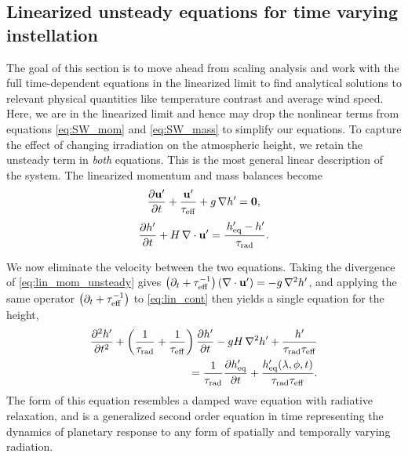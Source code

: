 \documentclass[trackchanges,twocolumn]{aastex7}
\begin{document}
\subsection{Linearized unsteady equations for time varying instellation} \label{sec:second_order}

The goal of this section is to move ahead from scaling analysis and work with the full time-dependent equations in the linearized limit to find analytical solutions to relevant physical quantities like temperature contrast and average wind speed. Here, we are in the linearized limit and hence may drop the nonlinear terms from equations \eqref{eq:SW_mom} and \eqref{eq:SW_mass} to simplify our equations. To capture the effect of changing irradiation on the atmospheric height, we retain the unsteady term in \emph{both} equations. This is the most general linear description of the system. The linearized momentum and mass balances become
\begin{equation}
  \frac{\partial \mathbf{u}'}{\partial t} + \frac{\mathbf{u}'}{\tau_{\rm eff}} + g\,\nabla h' = \mathbf{0},
\label{eq:lin_mom_unsteady}
\end{equation}
\begin{equation}
  \frac{\partial h'}{\partial t} + H\,\nabla\cdot\mathbf{u}'
  = \frac{\,h_{\rm eq}' - h'}{\tau_{\rm rad}}.
\label{eq:lin_cont}
\end{equation}

We now eliminate the velocity between the two equations. Taking the divergence of \eqref{eq:lin_mom_unsteady} gives $\left(\partial_t + \tau_{\rm eff}^{-1}\right)\left(\nabla\cdot\mathbf{u}'\right) = -g\,\nabla^2 h'$, and applying the same operator $\left(\partial_t + \tau_{\rm eff}^{-1}\right)$ to \eqref{eq:lin_cont} then yields a single equation for the height,
\begin{align}
   \frac{\partial^2 h'}{\partial t^2}
   + \left(\frac{1}{\tau_{\rm rad}} + \frac{1}{\tau_{\rm eff}}\right)\frac{\partial h'}{\partial t}
   - gH\,\nabla^2 h'
   + \frac{h'}{\tau_{\rm rad}\tau_{\rm eff}} \nonumber \\
   = \frac{1}{\tau_{\rm rad}}\frac{\partial h'_{\rm eq}}{\partial t}
   + \frac{h'_{\rm eq}(\lambda,\phi,t)}{\tau_{\rm rad}\tau_{\rm eff}} .
  \label{eq:lin_wave_pde}
\end{align}
The form of this equation resembles a damped wave equation with radiative relaxation, and is a generalized second order equation in time representing the dynamics of planetary response to any form of spatially and temporally varying radiation. 
\end{document}
